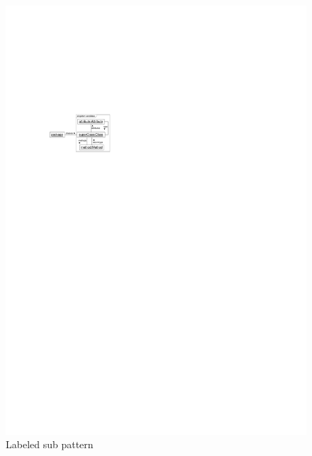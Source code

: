 {\begin{figure}[htbp]
  \centering
  \includegraphics[scale=1.0]{figures/SubPatterns2}
  \caption{Labeled sub pattern}
  \label{fig:labeledSubPattern}
\end{figure}

}
